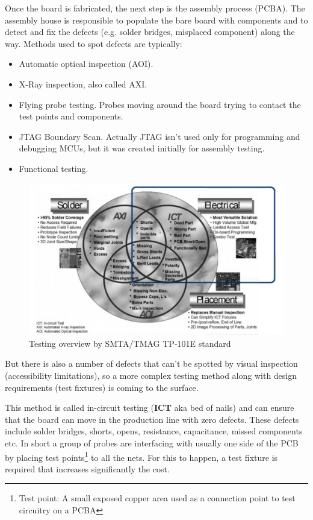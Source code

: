 \documentclass[final]{cubedoc}
\begin{document}
	Once the board is fabricated, the next step is the assembly process (PCBA). The assembly house is responsible to populate the bare board with components and to detect and fix the defects (e.g. solder bridges, misplaced component) along the way. Methods used to spot defects are typically:
	\begin{itemize}
		\item Automatic optical inspection (AOI).
		\item X-Ray inspection, also called AXI.
		\item Flying probe testing. Probes moving around the board trying to contact the test points and components.
		\item JTAG Boundary Scan. Actually JTAG isn't used only for programming and debugging MCUs, but it was created initially for assembly testing.
		\item Functional testing. 
	\end{itemize} 
	
	\begin{figure}[h!]
		\centering
		\includegraphics[keepaspectratio, width = \textwidth, height=.4\textheight]{assets/testing_overview.png}
		\caption{Testing overview by SMTA/TMAG TP-101E standard}
	\end{figure}
	
	But there is also a number of defects that can't be spotted by visual inspection (accessibility limitations), so a more complex testing method along with design requirements (test fixtures) is coming to the surface. 
	
	This method is called in-circuit testing (\textbf{ICT} aka bed of nails) and can ensure that the board can move in the production line with zero defects. These defects include solder bridges, shorts, opens, resistance, capacitance, missed components etc. In short a group of probes are interfacing with usually one side of the PCB  by placing test points\footnote{Test point: A small exposed copper area used as a connection point to test circuitry on a PCBA} to all the nets. For this to happen, a test fixture is required that increases significantly the cost.
	
\end{document}
